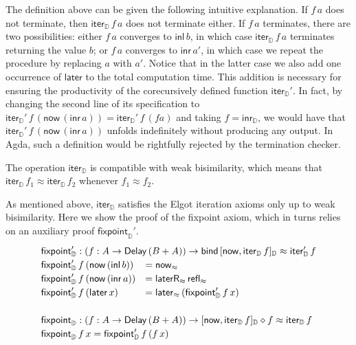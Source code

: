 \documentclass[runningheads,a4paper]{llncs}
\newcommand{\inl}{\mathsf{inl}}
\newcommand{\inr}{\mathsf{inr}}
\newcommand{\Delay}{\ensuremath{\mathsf{Delay}\,}}
\newcommand{\now}{\mathsf{now}}
\newcommand{\later}{\mathsf{later}}
\newcommand{\laterR}{\mathsf{laterR}}
\newcommand{\bind}{\mathsf{bind}}
\newcommand{\D}{\mathbb{D}}
\newcommand{\copairD}[2]{[#1,#2]_{\D}}
\newcommand{\inrD}{\mathsf{inr}_{\D}}
\newcommand{\iterD}{\mathsf{iter}_\D}
\newcommand{\unfolding}{\mathsf{fixpoint}_\D}
\newcommand{\refl}{\mathsf{refl}}
\begin{document}
The definition above can be given the following intuitive
explanation. If $f\,a$ does not terminate, then $\iterD\,f\,a$ does
not terminate either. If $f\,a$ terminates, there are two
possibilities: either $f\,a$ converges to $\inl\,b$, in which case
$\iterD\,f\,a$ terminates returning the value $b$; or $f\,a$ converges
to $\inr\,a'$, in which case we repeat the procedure by replacing $a$
with $a'$. Notice that in the latter case we also add one occurrence
of $\later$ to the total computation time. This addition is necessary
for ensuring the productivity of the corecursively defined function
$\iterD'$. In fact, by changing the second line of its specification to
$\iterD' \,f \,(\now \,(\inr\, a)) = \iterD' \,f \,(f a)$
and taking $f = \inrD$, we would have that $\iterD' \,f \,(\now
\,(\inr\, a))$ unfolds indefinitely without producing any output. In
Agda, such a definition would be rightfully rejected by the termination
checker. 

The operation $\iterD$ is compatible with weak bisimilarity, which means
that $\iterD\,f_1 \approx \iterD\,f_2$ whenever $f_1 \approx f_2$.

As mentioned above, $\iterD$ satisfies the Elgot iteration axioms only
up to weak bisimilarity. Here we show the proof of the fixpoint
axiom, which in turns relies on an auxiliary proof $\unfolding'$. 
\[
\def\arraystretch{1.2}
\begin{array}{ll}
\multicolumn{2}{l}{\unfolding' : (f : A \to \Delay (B + A)) \to
  \bind\, \copairD {\now}{\iterD \,f} \approx \iterD' \,f} \\
\unfolding' \,f \,(\now \,(\inl \,b)) & = \now_\approx \\
\unfolding' \,f \,(\now \,(\inr \,a)) & = \laterR_{\approx} \,
  \refl_\approx \\
\unfolding' \,f \,(\later \,x) & = \later_\approx \,(\unfolding'\, f\,
  x) \\
 \\
\multicolumn{2}{l}{\unfolding : (f : A \to \Delay (B + A)) \to
  \copairD {\now}{\iterD \,f}\diamond f \approx \iterD \,f}\\
\multicolumn{2}{l}{\unfolding \,f\,x = \unfolding'\,f\,(f\,x)}
\end{array}
\]
\end{document}
